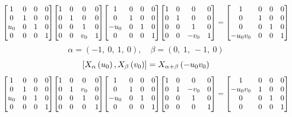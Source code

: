 \documentclass[11pt]{article}
\theoremstyle{definition}
\begin{document}
\[
\scaletoalign{\textwidth}{{\left[\begin{matrix}1 & 0 & 0 & 0\\0 & 1 & 0 & 0\\u_{0} & 0 & 1 & 0\\0 & 0 & 0 & 1\end{matrix}\right]} {\left[\begin{matrix}1 & 0 & 0 & 0\\0 & 1 & 0 & 0\\0 & 0 & 1 & 0\\0 & 0 & v_{0} & 1\end{matrix}\right]} {\left[\begin{matrix}1 & 0 & 0 & 0\\0 & 1 & 0 & 0\\- u_{0} & 0 & 1 & 0\\0 & 0 & 0 & 1\end{matrix}\right]} {\left[\begin{matrix}1 & 0 & 0 & 0\\0 & 1 & 0 & 0\\0 & 0 & 1 & 0\\0 & 0 & - v_{0} & 1\end{matrix}\right]} = {\left[\begin{matrix}1 & 0 & 0 & 0\\0 & 1 & 0 & 0\\0 & 0 & 1 & 0\\- u_{0} v_{0} & 0 & 0 & 1\end{matrix}\right]}}
\]
\[
\alpha = \left( -1, \  0, \  1, \  0\right), \quad \beta = \left( 0, \  1, \  -1, \  0\right)
\]
\[
\scaletoalign{\textwidth}{\left[ X_{\alpha}\left(u_{0}\right), X_{\beta}\left(v_{0}\right) \right] = X_{\alpha + \beta}\left(- u_{0} v_{0}\right)}
\]
\[
\scaletoalign{\textwidth}{{\left[\begin{matrix}1 & 0 & 0 & 0\\0 & 1 & 0 & 0\\u_{0} & 0 & 1 & 0\\0 & 0 & 0 & 1\end{matrix}\right]} {\left[\begin{matrix}1 & 0 & 0 & 0\\0 & 1 & v_{0} & 0\\0 & 0 & 1 & 0\\0 & 0 & 0 & 1\end{matrix}\right]} {\left[\begin{matrix}1 & 0 & 0 & 0\\0 & 1 & 0 & 0\\- u_{0} & 0 & 1 & 0\\0 & 0 & 0 & 1\end{matrix}\right]} {\left[\begin{matrix}1 & 0 & 0 & 0\\0 & 1 & - v_{0} & 0\\0 & 0 & 1 & 0\\0 & 0 & 0 & 1\end{matrix}\right]} = {\left[\begin{matrix}1 & 0 & 0 & 0\\- u_{0} v_{0} & 1 & 0 & 0\\0 & 0 & 1 & 0\\0 & 0 & 0 & 1\end{matrix}\right]}}
\]
\end{document}
